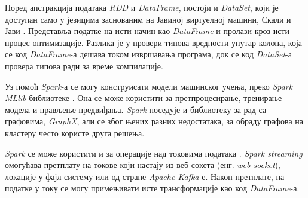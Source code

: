 \documentclass[12pt,oneside]{memoir}
\begin{document}
Поред апстракција података \textit{RDD} и \textit{DataFrame}, постоји и \textit{DataSet}, који је доступан само у језицима заснованим на Јавиној виртуелној машини, Скали и Јави \cite{spark_guide}. Представља податке на исти начин као \textit{DataFrame} и пролази кроз исти процес оптимизације. Разлика је у провери типова вредности унутар колона, која се код \textit{DataFrame}-а дешава током извршавања програма, док се код \textit{DataSet}-а провера типова ради за време компилације.

Уз помоћ \textit{Spark}-а се могу конструисати модели машинског учења, преко \textit{Spark MLlib} библиотеке \cite{spark_guide}. Она се може користити за претпроцесирање, тренирање модела и прављење предвиђања. \textit{Spark} поседује и библиотеку за рад са графовима, \textit{GraphX}, али се због њених разних недостатака, за обраду графова на кластеру често користе друга решења.

\textit{Spark} се може користити и за операције над токовима података \cite{spark_streaming}. \textit{Spark streaming} омогућава претплату на токове који настају из веб сокета (енг. \textit{web socket}), локације у фајл систему или од стране \textit{Apache Kafka}-е. Након претплате, на податке у току се могу примењивати исте трансформације као код \textit{DataFrame}-а.

\end{document}
